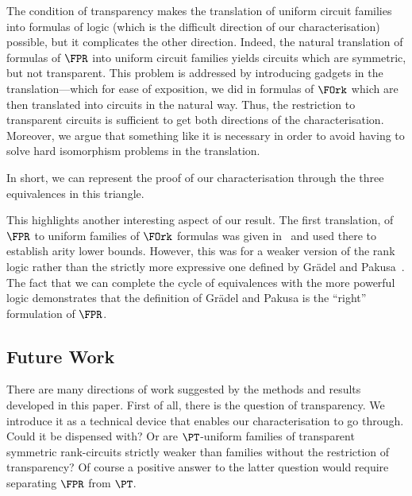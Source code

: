 \documentclass[a4paper,UKenglish]{lipics-v2018}
\begin{document}
The condition of transparency makes the translation of uniform circuit families
into formulas of logic (which is the difficult direction of our
characterisation) possible, but it complicates the other direction. Indeed, the
natural translation of formulas of $\FPR$ into uniform circuit families yields
circuits which are symmetric, but not transparent. This problem is addressed by
introducing gadgets in the translation---which for ease of exposition, we did in
formulas of $\FOrk$ which are then translated into circuits in the natural way.
Thus, the restriction to transparent circuits is sufficient to get both
directions of the characterisation. Moreover, we argue that something like it is
necessary in order to avoid having to solve hard isomorphism problems in the
translation.

In short, we can represent the proof of our characterisation through the three
equivalences in this triangle.

\begin{center}
\end{center}

This highlights another interesting aspect of our result. The first translation,
of $\FPR$ to uniform families of $\FOrk$ formulas was given
in~\cite{Dawar09logicswith} and used there to establish arity lower bounds.
However, this was for a weaker version of the rank logic rather than the
strictly more expressive one defined by Gr\"{a}del and Pakusa~\cite{GradelP15a}.
The fact that we can complete the cycle of equivalences with the more powerful
logic demonstrates that the definition of Gr\"{a}del and Pakusa is the ``right''
formulation of $\FPR$.

\subsection*{Future Work}
There are many directions of work suggested by the methods and results developed
in this paper. First of all, there is the question of transparency. We introduce
it as a technical device that enables our characterisation to go through. Could
it be dispensed with? Or are $\PT$-uniform families of transparent symmetric
rank-circuits strictly weaker than families without the restriction of
transparency? Of course a positive answer to the latter question would require
separating $\FPR$ from $\PT$.
\end{document}
